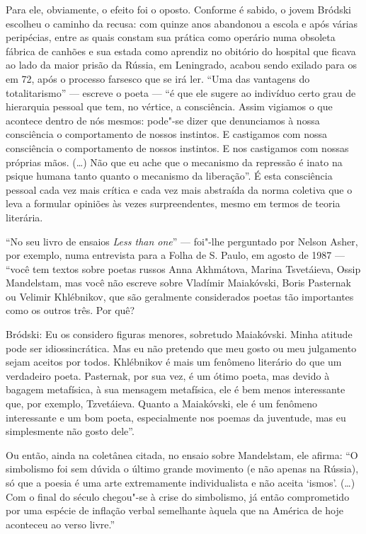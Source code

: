 Para ele, obviamente, o efeito foi o oposto. Conforme é sabido, o jovem
Bródski escolheu o caminho da recusa: com quinze anos abandonou a escola
e após várias peripécias, entre as quais constam sua prática como
operário numa obsoleta fábrica de canhões e sua estada como aprendiz no
obitório do hospital que ficava ao lado da maior prisão da Rússia, em
Leningrado, acabou sendo exilado para os  em 72, após o processo
farsesco que se irá ler. ``Uma das vantagens do totalitarismo'' ---
escreve o poeta --- ``é que ele sugere ao indivíduo certo grau de
hierarquia pessoal que tem, no vértice, a consciência. Assim vigiamos o
que acontece dentro de nós mesmos: pode"-se dizer que denunciamos à nossa
consciência o comportamento de nossos instintos. E castigamos com nossa
consciência o comportamento de nossos instintos. E nos castigamos com
nossas próprias mãos. (\ldots{}) Não que eu ache que o mecanismo da repressão
é inato na psique humana tanto quanto o mecanismo da liberação''. É esta
consciência pessoal cada vez mais crítica e cada vez mais abstraída da
norma coletiva que o leva a formular opiniões às vezes surpreendentes,
mesmo em termos de teoria literária.

``No seu livro de ensaios \emph{Less than one}'' --- foi"-lhe perguntado
por Nelson Asher, por exemplo, numa entrevista para a Folha de S. Paulo,
em agosto de 1987 --- ``você tem textos sobre poetas russos Anna
Akhmátova, Marina Tsvetáieva, Ossip Mandelstam, mas você não escreve
sobre Vladímir Maiakóvski, Boris Pasternak ou Velimir Khlébnikov, que
são geralmente considerados poetas tão importantes como os outros três.
Por quê?

Bródski: Eu os considero figuras menores, sobretudo Maiakóvski. Minha
atitude pode ser idiossincrática. Mas eu não pretendo que meu gosto ou
meu julgamento sejam aceitos por todos. Khlébnikov é mais um fenômeno
literário do que um verdadeiro poeta. Pasternak, por sua vez, é um ótimo
poeta, mas devido à bagagem metafísica, à sua mensagem metafísica, ele é
bem menos interessante que, por exemplo, Tzvetáieva. Quanto a
Maiakóvski, ele é um fenômeno interessante e um bom poeta, especialmente
nos poemas da juventude, mas eu simplesmente não gosto dele''.

Ou então, ainda na coletânea citada, no ensaio sobre Mandelstam, ele
afirma: ``O simbolismo foi sem dúvida o último grande movimento (e não
apenas na Rússia), só que a poesia é uma arte extremamente
individualista e não aceita `ismos'. (\ldots{}) Com o final do século
chegou"-se à crise do simbolismo, já então comprometido por uma espécie
de inflação verbal semelhante àquela que na América de hoje aconteceu ao
verso livre.''

